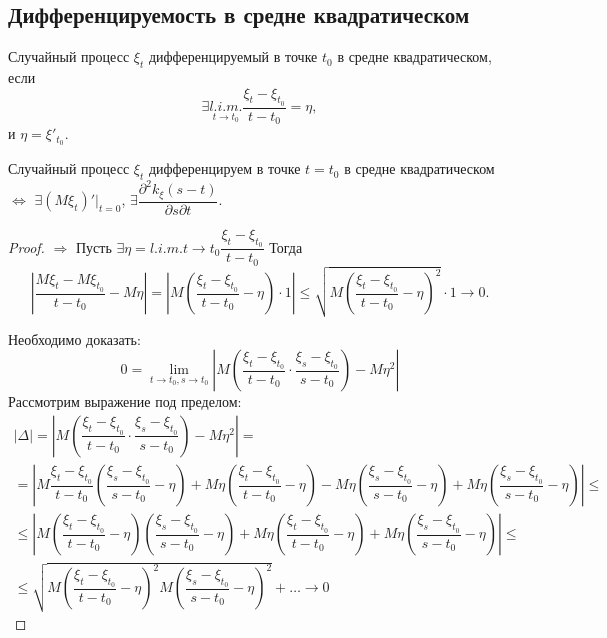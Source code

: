 \subsection{Дифференцируемость в средне квадратическом}

\begin{definition}
  Случайный процесс $\xi_t$ дифференцируемый в точке $t_0$ в средне квадратическом, если
  \[
    \exists \underset{t \to t_0}{l.i.m.} \dfrac{\xi_t - \xi_{t_0}}{t - t_0} = \eta,
  \]
  и $\eta = \xi'_{t_0}$.
\end{definition}

\begin{theorem}
  Случайный процесс $\xi_t$ дифференцируем в точке $t = t_0$ в средне квадратическом
  $\Leftrightarrow$ $\exists (M\xi_t)' |_{t=0}$, $\exists \dfrac{\partial^2 k_\xi(s-t)}{\partial s \partial t}$.
\end{theorem}
\begin{proof}
  $\Rightarrow$ Пусть $\exists \eta = l.i.m. {t\to t_0} \dfrac{\xi_t - \xi_{t_0}}{t-t_0}$
  Тогда
  \[
    \left| \dfrac{M\xi_t - M\xi_{t_0}}{t-t_0} - M\eta \right|
    = \left| M \left( \dfrac{\xi_t - \xi_{t_0}}{t-t_0} - \eta \right) \cdot 1 \right| 
    \leqslant \sqrt{M \left( \dfrac{\xi_t - \xi_{t_0}}{t-t_0} - \eta \right)^2 } \cdot 1
    \to 0.
  \]
    
  Необходимо доказать:
  \[
    0 = \lim_{t\to t_0, s\to t_0} \left| M \left( \dfrac{\xi_t - \xi_{t_0}}{t-t_0} \cdot \dfrac{\xi_s - \xi_{t_0}}{s-t_0} \right) - M\eta^2 \right| 
  \]
  Рассмотрим выражение под пределом:
  \begin{multline*}
    |\Delta| = \left| M \left( \dfrac{\xi_t - \xi_{t_0}}{t-t_0} \cdot \dfrac{\xi_s - \xi_{t_0}}{s-t_0} \right) - M\eta^2 \right|  = \\
    = \left|
      M \dfrac{\xi_t - \xi_{t_0}}{t-t_0} \left( \dfrac{\xi_s - \xi_{t_0}}{s-t_0} - \eta \right)
      + M\eta \left( \dfrac{\xi_t - \xi_{t_0}}{t-t_0} - \eta \right) 
      - M \eta \left(\dfrac{\xi_s - \xi_{t_0}}{s-t_0} - \eta\right)
      + M \eta \left( \dfrac{\xi_s - \xi_{t_0}}{s-t_0} - \eta \right)  \right| \leqslant \\
      \leqslant \left| 
      M \left(\dfrac{\xi_t - \xi_{t_0}}{t-t_0}- \eta \right) \left( \dfrac{\xi_s - \xi_{t_0}}{s-t_0}-\eta \right)
      + M \eta \left( \dfrac{\xi_t - \xi_{t_0}}{t-t_0} - \eta \right) + M\eta \left( \dfrac{\xi_s - \xi_{t_0}}{s-t_0} - \eta \right)\right|
      \leqslant \\ \leqslant
      \sqrt{M \left( \dfrac{\xi_t - \xi_{t_0}}{t-t_0} -\eta \right)^2 M \left( \dfrac{\xi_s - \xi_{t_0}}{s-t_0} - \eta \right) ^2 } + \dots \to 0
  \end{multline*}
\end{proof}

